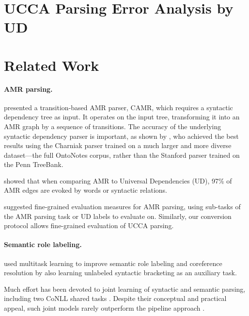 \documentclass[11pt,a4paper]{article}
\begin{document}
\section{UCCA Parsing Error Analysis by UD}\label{sec:parser_error}



\section{Related Work}\label{sec:related_work}

\paragraph{AMR parsing.}

presented a transition-based AMR parser, CAMR, which requires a
syntactic dependency tree as input.
It operates on the input tree, transforming it into an AMR graph
by a sequence of transitions.
The accuracy of the underlying syntactic dependency parser is important,
as shown by ,
who achieved the best results using the Charniak parser trained on a
much larger and more diverse dataset---the full OntoNotes corpus,
rather than the Stanford parser trained on the Penn TreeBank.

 showed that when comparing AMR to Universal Dependencies (UD),
97\% of AMR edges are evoked by words or syntactic relations.

 suggested fine-grained evaluation measures
for AMR parsing, using sub-tasks of the AMR parsing task or UD labels to evaluate on.
Similarly, our conversion protocol allows fine-grained evaluation of UCCA parsing.

\paragraph{Semantic role labeling.}

 used multitask learning to improve semantic role labeling and coreference resolution
by also learning unlabeled syntactic bracketing as an auxiliary task.

Much effort has been devoted to joint learning of syntactic
and semantic parsing, including
two CoNLL shared tasks \cite{surdeanu2008conll,hajivc2009conll}.
Despite their conceptual and practical appeal, such joint models rarely outperform
the pipeline approach %
\cite{lluis2008joint,henderson2013multilingual,D15-1169,swayamdipta-EtAl:2016:CoNLL,swayamdipta2017frame}.
\end{document}

